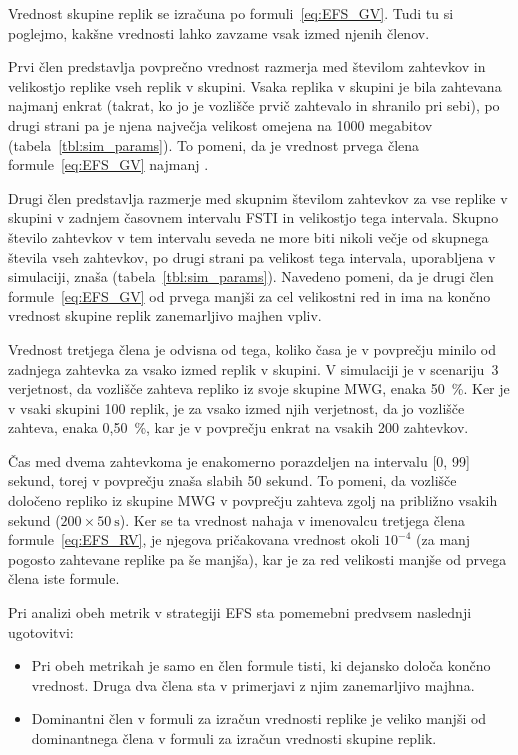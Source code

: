 \documentclass[a4paper, 12pt]{book}
\begin{document}
Vrednost skupine replik se izračuna po formuli~\eqref{eq:EFS_GV}. Tudi tu si
poglejmo, kakšne vrednosti lahko zavzame vsak izmed njenih členov.

Prvi člen predstavlja povprečno vrednost razmerja med številom zahtevkov in
velikostjo replike vseh replik v skupini. Vsaka replika v skupini je bila
zahtevana najmanj enkrat (takrat, ko jo je vozlišče prvič zahtevalo in shranilo
pri sebi), po drugi strani pa je njena največja velikost omejena na
1000 megabitov (tabela~\ref{tbl:sim_params}). To pomeni, da je vrednost
prvega člena formule~\eqref{eq:EFS_GV} najmanj .

Drugi člen predstavlja razmerje med skupnim številom zahtevkov za vse replike
v skupini v zadnjem časovnem intervalu FSTI in velikostjo tega intervala.
Skupno število zahtevkov v tem intervalu seveda ne more biti nikoli večje od
skupnega števila vseh zahtevkov, po drugi strani pa velikost tega intervala,
uporabljena v simulaciji, znaša  (tabela~\ref{tbl:sim_params}).
Navedeno pomeni, da je drugi člen formule~\eqref{eq:EFS_GV} od prvega manjši za
cel velikostni red in ima na končno vrednost skupine replik zanemarljivo
majhen vpliv.

Vrednost tretjega člena je odvisna od tega, koliko časa je v povprečju minilo
od zadnjega zahtevka za vsako izmed replik v skupini. V simulaciji je v
scenariju~3 verjetnost, da vozlišče zahteva repliko iz svoje
skupine MWG, enaka 50~\%. Ker je v vsaki skupini 100 replik, je za vsako
izmed njih verjetnost, da jo vozlišče zahteva, enaka 0,50~\%, kar je v
povprečju enkrat na vsakih 200 zahtevkov.

Čas med dvema zahtevkoma je enakomerno porazdeljen na intervalu [0, 99] sekund,
torej v povprečju znaša slabih 50 sekund. To pomeni, da vozlišče določeno
repliko iz skupine MWG v povprečju zahteva zgolj na približno vsakih
 sekund ($200 \times 50\:\text{s}$).
Ker se ta vrednost nahaja v imenovalcu tretjega člena
formule~\eqref{eq:EFS_RV}, je njegova pričakovana vrednost okoli $10^{-4}$ (za
manj pogosto zahtevane replike pa še manjša), kar je za red velikosti manjše
od prvega člena iste formule.

Pri analizi obeh metrik v strategiji EFS sta pomemebni predvsem naslednji
ugotovitvi:
\begin{itemize}
\item Pri obeh metrikah je samo en člen formule tisti, ki dejansko določa
končno vrednost. Druga dva člena sta v primerjavi z njim zanemarljivo majhna.

\item Dominantni člen v formuli za izračun vrednosti replike je veliko manjši
od dominantnega člena v formuli za izračun vrednosti skupine replik.
\end{itemize}
\end{document}
